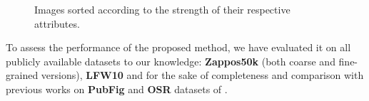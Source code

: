 \begin{figure}
{}
\caption{Images sorted according to the strength of their respective attributes.}
\label{figspectrum}
\end{figure}

To assess the performance of the proposed method, we have evaluated it on all publicly available datasets to our knowledge: \textbf{Zappos50k} \cite{Yu2014} (both coarse and fine-grained versions), \textbf{LFW10} \cite{Sandeep_2014_CVPR} and for the sake of completeness and comparison with previous works on \textbf{PubFig} and \textbf{OSR} datasets of \cite{parikh2011}.


